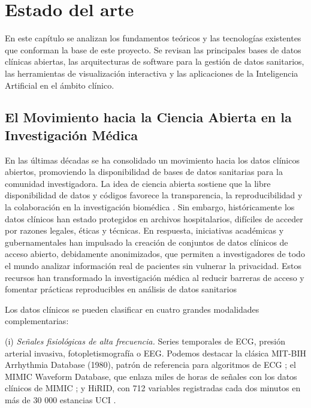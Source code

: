 \chapter{Estado del arte}

En este capítulo se analizan los fundamentos teóricos y las tecnologías existentes que conforman la base de este proyecto. Se revisan las principales bases de datos clínicas abiertas, las arquitecturas de software para la gestión de datos sanitarios, las herramientas de visualización interactiva y las aplicaciones de la Inteligencia Artificial en el ámbito clínico.

\section{El Movimiento hacia la Ciencia Abierta en la Investigación Médica}

En las últimas décadas se ha consolidado un movimiento hacia los datos clínicos abiertos, promoviendo la disponibilidad de bases de datos sanitarias para la comunidad investigadora. La idea de ciencia abierta sostiene que la libre disponibilidad de datos y códigos favorece la transparencia, la reproducibilidad y la colaboración en la investigación biomédica \cite{Lvovs2025_balancing}. Sin embargo, históricamente los datos clínicos han estado protegidos en archivos hospitalarios, difíciles de acceder por razones legales, éticas y técnicas. En respuesta, iniciativas académicas y gubernamentales han impulsado la creación de conjuntos de datos clínicos de acceso abierto, debidamente anonimizados, que permiten a investigadores de todo el mundo analizar información real de pacientes sin vulnerar la privacidad. Estos recursos han transformado la investigación médica al reducir barreras de acceso y fomentar prácticas reproducibles en análisis de datos sanitarios

\newpage
Los datos clínicos se pueden clasificar en cuatro grandes modalidades complementarias:


(i) \emph{Señales fisiológicas de alta frecuencia.} Series temporales de ECG, presión arterial invasiva, fotopletismografía o EEG. Podemos destacar la clásica MIT-BIH Arrhythmia Database (1980), patrón de referencia para algoritmos de ECG \cite{Impact_MIT-BIH}; el MIMIC Waveform Database, que enlaza miles de horas de señales con los datos clínicos de MIMIC \cite{Moody2022_MIMICIVWaveform}; y HiRID, con 712 variables registradas cada dos minutos en más de 30 000 estancias UCI \cite{Faltys2021HiRID}.

